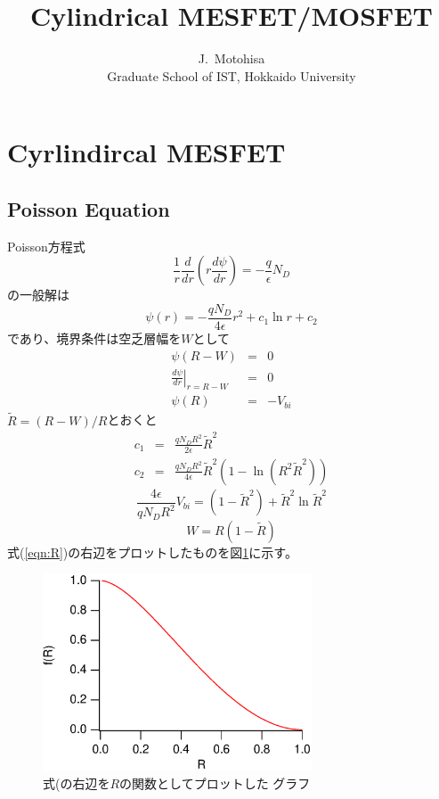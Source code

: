 \documentclass[11pt,uplatex]{jsarticle}
\def\d#1#2{\frac{d #1}{d #2}}
\begin{document}
\title{Cylindrical MESFET/MOSFET}
\author{J.~Motohisa\\Graduate School of IST, Hokkaido University}
\maketitle

\section{Cyrlindircal MESFET}
\subsection{Poisson Equation}
Poisson方程式
\begin{equation}
 \frac{1}{r} \d{}{r}(r\d{\psi}{r}) = -\frac{q}{\epsilon} N_D
\end{equation}
の一般解は
\begin{equation}
\psi(r) = -\frac{q N_D}{4 \epsilon }r^2 +c_1 \ln r + c_2
\end{equation}
であり、境界条件は空乏層幅を$W$として
\begin{eqnarray}
 \psi(R-W)&=&0 \\
 \left. \d{\psi}{r}\right|_{r=R-W}&=&0\\
 \psi(R)&=&-V_{bi}
\end{eqnarray}
$\tilde{R}=(R-W)/R$とおくと
\begin{eqnarray}
c_1 &=& \frac{q N_D R^2}{2 \epsilon} \tilde{R}^2 \\
c_2& =& \frac{q N_D R^2}{4 \epsilon}\tilde{R}^2 (1-\ln (R^2\tilde{R}^2))
\end{eqnarray}
\begin{equation}
 \frac{4 \epsilon}{q N_D R^2} V_{bi} = (1-\tilde{R}^2)+\tilde{R}^2 \ln \tilde{R}^2\label{eqn:R}
\end{equation}
\begin{equation}
 W = R(1-\tilde{R})
\end{equation}
式(\ref{eqn:R})の右辺をプロットしたものを図\ref{fig:rgraph}に示す。

\begin{figure}[htbp]
 \begin{center}
  \includegraphics[width=8cm,keepaspectratio]{Rgraph.eps}
  \caption{式(\protect{\ref{eqn:R})}の右辺を$R$の関数としてプロットした
  グラフ\label{fig:rgraph}}
  \end{center}
 \end{figure}
\end{document}
